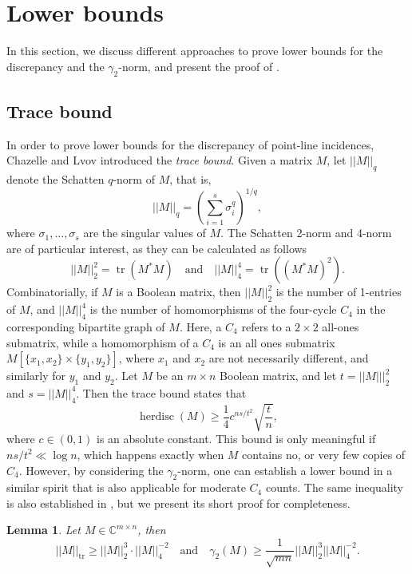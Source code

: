 \documentclass[11pt]{article}
\theoremstyle{plain}
\newtheorem{lemma}[theorem]{Lemma}
\theoremstyle{definition}
\DeclareMathOperator{\tr}{tr}
\DeclareMathOperator{\herdisc}{herdisc}
\begin{document}
	\section{Lower bounds}
	
	In this section, we discuss different approaches to prove lower bounds for the discrepancy and the $\gamma_2$-norm, and present the proof of .
	
	\subsection{Trace bound}\label{sect:trace-bound}
	
	In order to prove lower bounds for the discrepancy of point-line incidences, Chazelle and Lvov \cite{ChL} introduced the \emph{trace bound}. Given a matrix $M$, let $||M||_q$ denote the Schatten $q$-norm of $M$, that is, 
	$$||M||_q=\left(\sum_{i=1}^s \sigma_i^q\right)^{1/q},$$
	where $\sigma_1,\dots,\sigma_{s}$ are the singular values of $M$. The Schatten 2-norm and 4-norm are of particular interest, as they can be calculated as follows $$||M||_{2}^2=\tr(M^*M)\quad\text{and}\quad ||M||_4^4=\tr((M^*M)^2).$$
	Combinatorially, if $M$ is a Boolean matrix, then $||M||_2^2$ is the number of 1-entries of $M$, and $||M||_4^4$ is the number of homomorphisms of the four-cycle $C_4$ in the corresponding bipartite graph of $M$. Here, a $C_4$ refers to a $2\times 2$ all-ones submatrix, while a homomorphism of a $C_4$ is an all ones submatrix $M[\{x_1,x_2\}\times \{y_1,y_2\}]$, where $x_1$ and $x_2$ are not necessarily different, and similarly for $y_1$ and $y_2$. Let $M$ be an $m\times n$ Boolean matrix, and let $t=||M|||_2^2$ and $s=||M||_4^4$. Then the trace bound \cite{ChL} states that
	\begin{equation}\label{equ:trace_bound}
		\herdisc(M)\geq \frac{1}{4}c^{ns/t^2}\sqrt{\frac{t}{n}},
	\end{equation}
	where $c\in (0,1)$ is an absolute constant. This bound is only meaningful if $ns/t^2\ll \log n$, which happens exactly when $M$ contains no, or very few copies of $C_4$. However, by considering the $\gamma_2$-norm, one can establish a lower bound in a similar spirit that is also applicable for moderate $C_4$ counts. The same inequality is also established in \cite{CHHNPS}, but we present its short proof for completeness.
	
	\begin{lemma}\label{lemma:trace_bound}
		Let $M\in \mathbb{C}^{m\times n}$, then
		$$||M||_{\tr}\geq ||M||_2^{3}\cdot ||M||_4^{-2}\quad\text{and}\quad\gamma_2(M)\geq \frac{1}{\sqrt{mn}}||M||_2^{3} ||M||_4^{-2}.$$
	\end{lemma}
	
\end{document}
